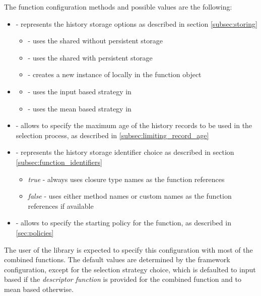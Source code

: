 The function configuration methods and possible values are the following:

\begin{itemize}
	\item {} - represents the history storage options as described in section \ref{subsec:storing}
	\begin{itemize}
		\item {} - uses the shared  without persistent storage
		\item {} - uses the shared  with persistent storage
		\item {} - creates a new instance of  locally in the function object
	\end{itemize}
\item {}
\begin{itemize}
	\item {} - uses the input based strategy in 
	\item {} - uses the mean based strategy in 
\end{itemize}
\item {} - allows to specify the maximum age of the history records to be used in the selection process, as described in \ref{subsec:limiting_record_age}
\item {} - represents the history storage identifier choice as described in section \ref{subsec:function_identifiers}
\begin{itemize}
	\item \textit{true} - always uses closure type names as the function references
	\item \textit{false} - uses either method names or custom names as the function references if available
\end{itemize}
\item {} - allows to specify the starting policy for the function, as described in \ref{sec:policies}
\end{itemize}

The user of the library is expected to specify this configuration with most of the combined functions. The default values are determined by the framework configuration, except for the selection strategy choice, which is defaulted to input based if the \textit{descriptor function} is provided for the combined function and to mean based otherwise.

